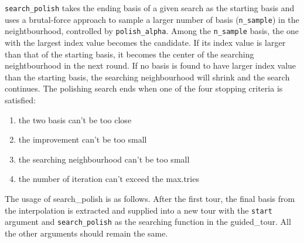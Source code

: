\documentclass[12pt]{article}
\providecommand{\tightlist}{%
  \setlength{\itemsep}{0pt}\setlength{\parskip}{0pt}}
\begin{document}
\texttt{search\_polish} takes the ending basis of a given search as the
starting basis and uses a brutal-force approach to sample a larger
number of basis (\texttt{n\_sample}) in the neightbourhood, controlled
by \texttt{polish\_alpha}. Among the \texttt{n\_sample} basis, the one
with the largest index value becomes the candidate. If its index value
is larger than that of the starting basis, it becomes the center of the
searching neightbourhood in the next round. If no basis is found to have
larger index value than the starting basis, the searching neighbourhood
will shrink and the search continues. The polishing search ends when one
of the four stopping criteria is satisfied:

\begin{enumerate}
\def\labelenumi{\arabic{enumi})}
\tightlist
\item
  the two basis can't be too close
\item
  the improvement can't be too small
\item
  the searching neighbourhood can't be too small
\item
  the number of iteration can't exceed the max.tries
\end{enumerate}

The usage of search\_polish is as follows. After the first tour, the
final basis from the interpolation is extracted and supplied into a new
tour with the \texttt{start} argument and \texttt{search\_polish} as the
searching function in the guided\_tour. All the other arguments should
remain the same.
\end{document}
